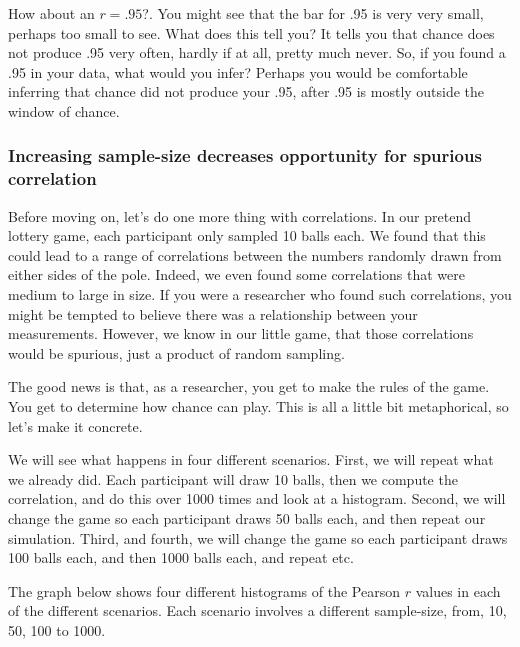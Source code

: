 \documentclass[
]{book}
\begin{document}
How about an \(r = .95\)?. You might see that the bar for .95 is very very small, perhaps too small to see. What does this tell you? It tells you that chance does not produce .95 very often, hardly if at all, pretty much never. So, if you found a .95 in your data, what would you infer? Perhaps you would be comfortable inferring that chance did not produce your .95, after .95 is mostly outside the window of chance.

\subsubsection{Increasing sample-size decreases opportunity for spurious correlation}\label{increasing-sample-size-decreases-opportunity-for-spurious-correlation}

Before moving on, let's do one more thing with correlations. In our pretend lottery game, each participant only sampled 10 balls each. We found that this could lead to a range of correlations between the numbers randomly drawn from either sides of the pole. Indeed, we even found some correlations that were medium to large in size. If you were a researcher who found such correlations, you might be tempted to believe there was a relationship between your measurements. However, we know in our little game, that those correlations would be spurious, just a product of random sampling.

The good news is that, as a researcher, you get to make the rules of the game. You get to determine how chance can play. This is all a little bit metaphorical, so let's make it concrete.

We will see what happens in four different scenarios. First, we will repeat what we already did. Each participant will draw 10 balls, then we compute the correlation, and do this over 1000 times and look at a histogram. Second, we will change the game so each participant draws 50 balls each, and then repeat our simulation. Third, and fourth, we will change the game so each participant draws 100 balls each, and then 1000 balls each, and repeat etc.

The graph below shows four different histograms of the Pearson \(r\) values in each of the different scenarios. Each scenario involves a different sample-size, from, 10, 50, 100 to 1000.
\end{document}
